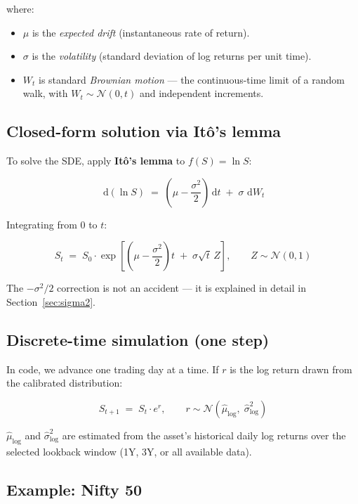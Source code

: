 \documentclass[11pt, a4paper]{article}
\newcommand{\N}{\mathcal{N}}
\newcommand{\dd}{\,\mathrm{d}}
\begin{document}
where:
\begin{itemize}[leftmargin=2em]
  \item $\mu$ is the \textit{expected drift} (instantaneous rate of return).
  \item $\sigma$ is the \textit{volatility} (standard deviation of log returns per unit time).
  \item $W_t$ is standard \textit{Brownian motion} — the continuous-time limit of a random walk, with $W_t \sim \N(0, t)$ and independent increments.
\end{itemize}

\subsection*{Closed-form solution via Itô's lemma}

To solve the SDE, apply \textbf{Itô's lemma} to $f(S) = \ln S$:

\[
  \dd(\ln S) \;=\; \left(\mu - \frac{\sigma^2}{2}\right)\dd t \;+\; \sigma\, \dd W_t
\]

Integrating from $0$ to $t$:

\begin{tcolorbox}[mathbox]
\[
  S_t \;=\; S_0 \cdot \exp\!\left[\left(\mu - \frac{\sigma^2}{2}\right)t \;+\; \sigma\sqrt{t}\, Z\right], \qquad Z \sim \N(0,1)
\]
\end{tcolorbox}

The $-\sigma^2/2$ correction is not an accident — it is explained in detail in Section~\ref{sec:sigma2}.

\subsection*{Discrete-time simulation (one step)}

In code, we advance one trading day at a time. If $r$ is the log return drawn from the calibrated distribution:

\begin{tcolorbox}[mathbox]
\[
  S_{t+1} \;=\; S_t \cdot e^{r}, \qquad r \sim \N\!\left(\hat\mu_{\log},\; \hat\sigma^2_{\log}\right)
\]
\end{tcolorbox}

$\hat\mu_{\log}$ and $\hat\sigma^2_{\log}$ are estimated from the asset's historical daily log returns over the selected lookback window (1Y, 3Y, or all available data).

\subsection*{Example: Nifty 50}
\end{document}
